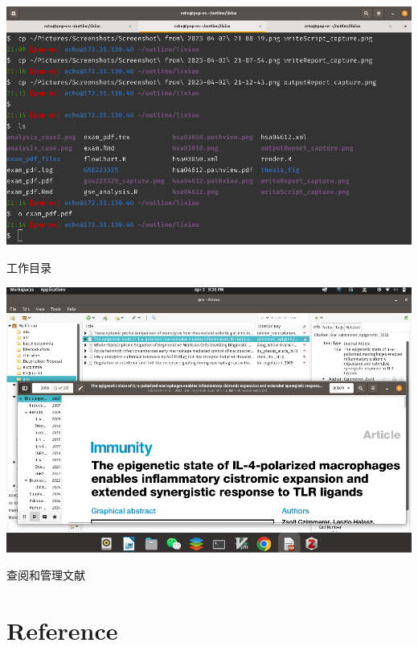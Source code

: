 \documentclass[
]{article}
\begin{document}
\bgroup {}
\includegraphics[width=13.89in]{thesis_fig/workDir_capture} \caption{工作目录}\label{fig:fig15}
\makeatletter \egroup

\bgroup {}
\includegraphics[width=13.89in]{thesis_fig/manageRef} \caption{查阅和管理文献}\label{fig:fig16}
\makeatletter \egroup

\hypertarget{bibliography}{%
\section*{Reference}\label{bibliography}}
\end{document}
